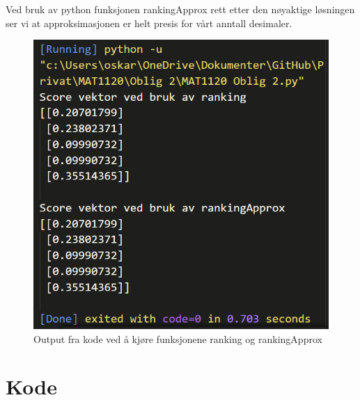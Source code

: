 \documentclass{article}
\begin{document}
Ved bruk av python funksjonen rankingApprox rett etter den nøyaktige løsningen ser vi at approksimasjonen er helt presis for vårt anntall desimaler.  
\begin{figure}[h!]
  \centering
  \includegraphics[scale = .7]{rank_rankapprox.png}
  \caption{Output fra kode ved å kjøre funksjonene ranking og rankingApprox}
  \label{fig:figure1}
\end{figure}


\newpage
\section*{Kode}

\end{document}
